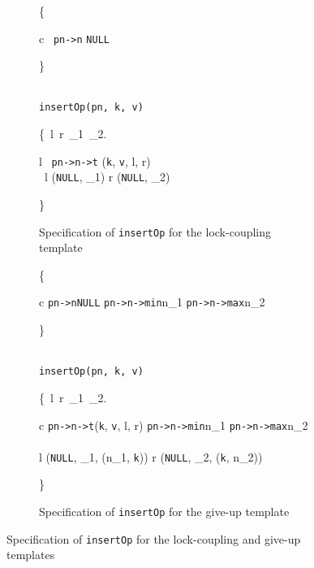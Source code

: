 \documentclass[sigplan,10pt, screen]{acmart}
\begin{document}
\begin{figure*}[h]
	\begin{subfigure}{\textwidth}
		\centering
		\begin{mathpar}
			{\color{blue}
				\left\{ 
				\begin{array}{c}
					\ \texttt{pn->n} \mapsto \texttt{NULL}  
				\end{array}
				\right\}
			} \vspace{-0.85em} 
			\\ 
			\texttt{insertOp(pn, k, v)} 
			\vspace{-0.85em} 
			\\
			{\color{blue}
				\left\{\exists \  l\ r\ \mathit{lk}_1\ _2.
				\begin{array}{l}
					\ \texttt{pn->n->t} \mapsto (\texttt{k}, \texttt{v}, l, r) \ \ast \ \\ 
					\ l \mapsto (\texttt{NULL}, _1)  \ast  r \mapsto (\texttt{NULL}, \mathit{lk}_2)
				\end{array}
				\right\}
			}
		\end{mathpar}
		\caption{Specification of \texttt{insertOp} for the lock-coupling template}
		\label{fig:insertOp_lock}
	\end{subfigure}
	\begin{subfigure}{\textwidth}
		\begin{mathpar}
			{\color{blue}
				\left\{ 
				\begin{array}{c}
					\texttt{pn->n}\mapsto \texttt{NULL}  \ast  \texttt{pn->n->min}\mapsto n_1  \ast  \texttt{pn->n->max}\mapsto n_2
				\end{array}
				\right\}
			} \vspace{-0.85em} 
			\\
			\texttt{insertOp(pn, k, v)}
			\vspace{-0.85em} 
			\\
			{\color{blue}
				\left\{\exists \ l\ r\ _1\ _2. 
				\begin{array}{c}
					\texttt{pn->n->t}\mapsto (\texttt{k}, \texttt{v}, l, r)  \ast  \texttt{pn->n->min}\mapsto n_1 \ast  \texttt{pn->n->max}\mapsto n_2  \ \ast \ 
					\\ l \mapsto (\texttt{NULL}, _1, (n_1, \texttt{k})) \ast  r \mapsto (\texttt{NULL}, \mathit{lk}_2, (\texttt{k}, n_2))
				\end{array}
				\right\}
			}
		\end{mathpar}
		\caption{Specification of \texttt{insertOp} for the give-up template}
		\label{fig:insertOp_giveup}
	\end{subfigure}
	\caption{Specification of \texttt{insertOp} for the lock-coupling and give-up templates}
	\label{fig:insertOp}
\end{figure*}
\end{document}
